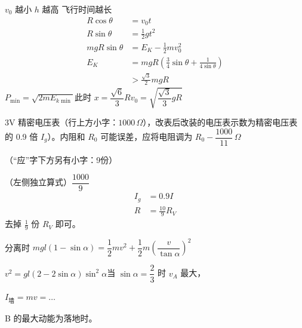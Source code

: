 \begin{problem}[1]

\begin{solution}
$v_0$ 越小 $h$ 越高 飞行时间越长
\begin{align*}
R\cos\theta&=v_0t\\
R\sin\theta&=\frac{1}{2}gt^2\\
mgR\sin\theta&=E_K-\frac{1}{2}mv_0^2\\
E_K&=mgR\left(\frac{3}{4}\sin\theta+\frac{1}{4\sin\theta}\right)\\
&>\frac{\sqrt{3}}{2}mgR %
\end{align*}
$P_{\min}=\sqrt{2mE_{k\min}}$\quad 此时 $x=\dfrac{\sqrt{6}}{3}R$\quad $v_0=\sqrt{\dfrac{\sqrt{3}}{3}gR}$
\end{solution}
\end{problem}
\begin{problem}[2]
3V 精密电压表{\scriptsize（行上方小字：$1000\,\Omega$）}，改表后改装的电压表示数为精密电压表的 0.9 倍 $I_g$）。内阻和 $R_0$ 可能误差，应将电阻调为 $R_0-\dfrac{1000}{11}\,\Omega$ %

（“应”字下方另有小字：9份）


\begin{solution}
（左侧独立算式）$\dfrac{1000}{9}$
\begin{align*}
I_g&=0.9I\\
R&=\frac{10}{9}R_V
\end{align*}
去掉 $\frac{1}{9}$ 份 $R_V$ 即可。
\end{solution}
\end{problem}
\begin{problem}[3]

\begin{solution}
分离时 $mgl(1-\sin\alpha)=\dfrac{1}{2}mv^2+\dfrac{1}{2}m\left(\dfrac{v}{\tan\alpha}\right)^2$

$v^2=gl(2-2\sin\alpha)\sin^2\alpha$\quad 当 $\sin\alpha=\dfrac{2}{3}$ 时 $v_A$ 最大，

$I_{\text{墙}}=mv=\ldots$

B 的最大动能为落地时。
\end{solution}
\end{problem}
